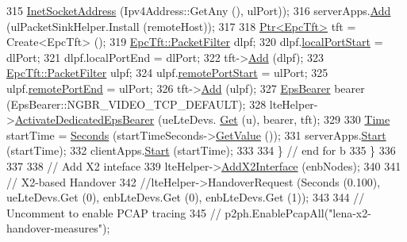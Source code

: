 \begin{DoxyCode}
315                                                \hyperlink{classns3_1_1InetSocketAddress}{InetSocketAddress} (Ipv4Address::GetAny (), 
      ulPort));
316           serverApps.\hyperlink{classns3_1_1ApplicationContainer_ad09ab1a1ad5849d518d5f4c262e38152}{Add} (ulPacketSinkHelper.Install (remoteHost));
317 
318           \hyperlink{classns3_1_1Ptr}{Ptr<EpcTft>} tft = Create<EpcTft> ();
319           \hyperlink{structns3_1_1EpcTft_1_1PacketFilter}{EpcTft::PacketFilter} dlpf;
320           dlpf.\hyperlink{structns3_1_1EpcTft_1_1PacketFilter_afd505cda437b1687abc4432a8bcefbaf}{localPortStart} = dlPort;
321           dlpf.localPortEnd = dlPort;
322           tft->\hyperlink{classns3_1_1EpcTft_a1228456a8abbe48cbc89bbe2d2e9af48}{Add} (dlpf);
323           \hyperlink{structns3_1_1EpcTft_1_1PacketFilter}{EpcTft::PacketFilter} ulpf;
324           ulpf.\hyperlink{structns3_1_1EpcTft_1_1PacketFilter_aa96ab9356c91b14059220d00155c32b5}{remotePortStart} = ulPort;
325           ulpf.\hyperlink{structns3_1_1EpcTft_1_1PacketFilter_a4bcdd15a9526e27eabd474276f691cf1}{remotePortEnd} = ulPort;
326           tft->\hyperlink{classns3_1_1EpcTft_a1228456a8abbe48cbc89bbe2d2e9af48}{Add} (ulpf);
327           \hyperlink{structns3_1_1EpsBearer}{EpsBearer} bearer (EpsBearer::NGBR\_VIDEO\_TCP\_DEFAULT);
328           lteHelper->\hyperlink{classns3_1_1LteHelper_af28041edd4c96bde1a2e07c90e363dcc}{ActivateDedicatedEpsBearer} (ueLteDevs.
      \hyperlink{classns3_1_1NetDeviceContainer_a677d62594b5c9d2dea155cc5045f4d0b}{Get} (u), bearer, tft);
329 
330           \hyperlink{classns3_1_1Time}{Time} startTime = \hyperlink{group__timecivil_ga33c34b816f8ff6628e33d5c8e9713b9e}{Seconds} (startTimeSeconds->\hyperlink{classns3_1_1UniformRandomVariable_a03822d8c86ac51e9aa83bbc73041386b}{GetValue} ());
331           serverApps.\hyperlink{classns3_1_1ApplicationContainer_a8eff87926507020bbe3e1390358a54a7}{Start} (startTime);
332           clientApps.\hyperlink{classns3_1_1ApplicationContainer_a8eff87926507020bbe3e1390358a54a7}{Start} (startTime);
333 
334         \} \textcolor{comment}{// end for b}
335     \}
336 
337 
338   \textcolor{comment}{// Add X2 inteface}
339   lteHelper->\hyperlink{classns3_1_1LteHelper_adbbd435f439200097e88a2965668bc26}{AddX2Interface} (enbNodes);
340 
341   \textcolor{comment}{// X2-based Handover}
342   \textcolor{comment}{//lteHelper->HandoverRequest (Seconds (0.100), ueLteDevs.Get (0), enbLteDevs.Get (0), enbLteDevs.Get
       (1));}
343 
344   \textcolor{comment}{// Uncomment to enable PCAP tracing}
345   \textcolor{comment}{// p2ph.EnablePcapAll("lena-x2-handover-measures");}

\end{DoxyCode}
